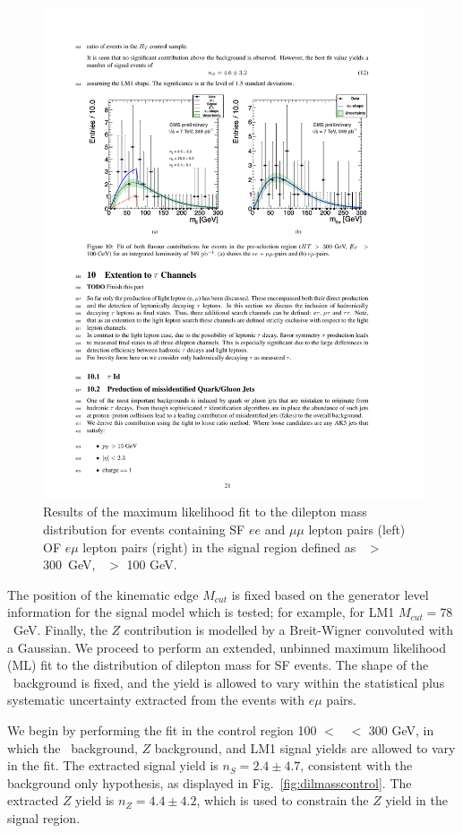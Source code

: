 \begin{figure}[tbh]
\begin{center}
\includegraphics[width=0.75\linewidth]{plots_final/dilmass.pdf}
\caption{\label{fig:dilmass}\protect 
Results of the maximum likelihood fit to the dilepton mass distribution for events containing 
SF $ee$ and $\mu\mu$ lepton pairs (left) OF $e\mu$ lepton pairs (right)  in the signal
region defined as \Ht\ $>$ 300~GeV, \MET\ $>$ 100 GeV.
}
\end{center}
\end{figure}

The position of the kinematic edge $M_{cut}$ is fixed based on the generator level
information for the signal model which is tested; for example, for LM1 
$M_{cut} = 78$~GeV. Finally, the $Z$ contribution is modelled by a Breit-Wigner 
convoluted with a Gaussian. We proceed to perform an extended, unbinned maximum 
likelihood (ML) fit to the distribution of dilepton mass for SF events. The shape of 
the \ttbar\ background is fixed, and the yield is allowed to vary within the 
statistical plus systematic uncertainty extracted from the events with $e\mu$ pairs. 

We begin by performing the fit in the control region 100 $<$ \Ht\ $<$ 300 GeV, in
which the \ttbar\ background, $Z$ background, and LM1 signal yields are allowed to vary in the fit. 
The extracted signal yield is $n_S = 2.4 \pm 4.7$, consistent with the background only 
hypothesis, as displayed in Fig.~\ref{fig:dilmasscontrol}. 
The extracted $Z$ yield is $n_Z = 4.4 \pm 4.2$, which is 
used to constrain the $Z$ yield in the signal region. 

